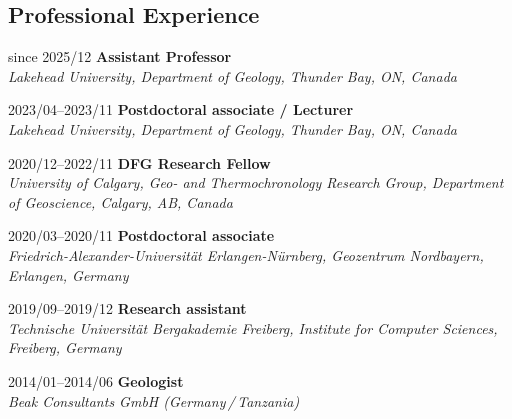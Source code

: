 \documentclass[10pt, paper=letter]{scrartcl} %
\begin{document}
\begin{cv}{}
    \section{Professional Experience}
    \begin{cvlist}{}
        \item[since 2025/12] \textbf{Assistant Professor}\\ \textit{Lakehead University,
            Department of Geology, Thunder Bay, ON, Canada}
        \item[2023/04--2023/11] \textbf{Postdoctoral associate / Lecturer}\\ \textit{Lakehead University,
            Department of Geology, Thunder Bay, ON, Canada} 
        \item[2020/12--2022/11] \textbf{DFG Research Fellow}\\
        \textit{University of Calgary, Geo- and Thermochronology Research Group, Department of Geoscience, Calgary, AB, Canada}\
        \item[2020/03--2020/11] \textbf{Postdoctoral associate}\\
        \textit{Friedrich-Alexander-Universit\"at Erlangen-N\"urnberg, Geozentrum Nordbayern, \mbox{Erlangen}, Germany}
        \item[2019/09--2019/12] \textbf{Research assistant}\\
        \textit{Technische Universit\"at Bergakademie Freiberg, Institute for Computer Sciences, Freiberg, Germany}

        \item[2014/01--2014/06] \textbf{Geologist}\\
        \textit{Beak Consultants GmbH (Germany\,/\,Tanzania)}


    \end{cvlist}


\end{cv}
\end{document}
